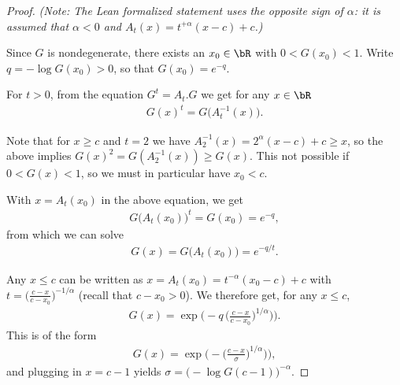 \begin{proof}

  \emph{(Note: The Lean formalized statement uses the opposite sign of $\alpha$:
  it is assumed that $\alpha < 0$ and $A_t(x) = t^{+\alpha} (x-c) + c$.)}

  Since $G$ is nondegenerate, there exists an $x_0 \in \bR$
  with $0 < G(x_0) < 1$. Write $q = -\log G(x_0) > 0$,
  so that $G(x_0) = e^{-q}$.

  For $t > 0$, from the equation $G^{t} = A_t . G$
  we get for any $x \in \bR$
  \begin{align*}
  G(x)^t = G \big( A_t^{-1}(x) \big) . %
  \end{align*}

  Note that for $x \ge c$ and $t = 2$ we have $A_2^{-1}(x) = 2^{\alpha}(x-c) + c \ge x$,
  so the above implies $G(x)^2 = G(A_2^{-1}(x)) \ge G(x)$.
  This not possible if $0 < G(x) < 1$, so we must in particular have $x_0 < c$.

  With $x = A_t(x_0)$ in the above equation, %
  we get
  \begin{align*}
    G\big( A_t(x_0) \big)^{t} = G(x_0) = e^{- q},
  \end{align*}
  from which we can solve
  \begin{align*}
    G(x) = G\big( A_t(x_0) \big) = e^{-q/t} .
  \end{align*}

  Any $x \le c$ can be written as $x = A_t(x_0) = t^{-\alpha} (x_0-c) + c$
  with $t = \big( \frac{c - x}{c - x_0} \big)^{-1/\alpha}$
  (recall that $c - x_0 > 0$).
  We therefore get, for any $x \le c$,
  \begin{align*}
    G(x) = \exp \Big( - q \, \big( \frac{c - x}{c - x_0} \big)^{1/\alpha} \big) \Big) .
  \end{align*}
  This is of the form
  \begin{align*}
    G(x) = \exp \Big( - \big( \frac{c - x}{\sigma} \big)^{1/\alpha} \big) \Big) ,
  \end{align*}
  and plugging in $x = c - 1$ yields $\sigma = \big(- \log G(c-1)\big)^{-\alpha}$.
\end{proof}


